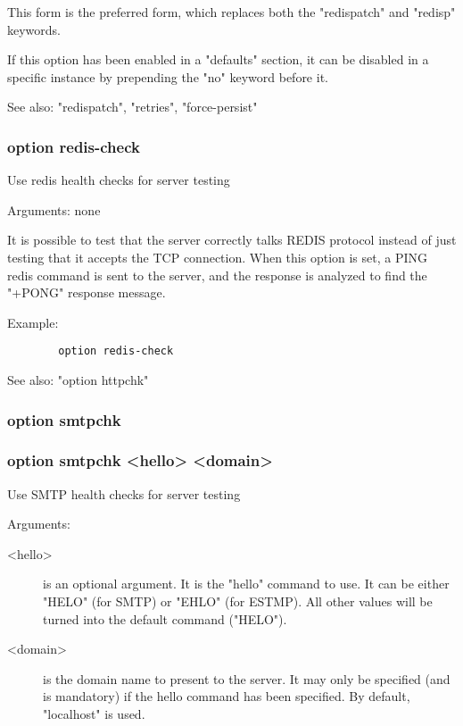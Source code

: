   This form is the preferred form, which replaces both the "redispatch" and
  "redisp" keywords.

  If this option has been enabled in a "defaults" section, it can be disabled
  in a specific instance by prepending the "no" keyword before it.

  See also: "redispatch", "retries", "force-persist"

\subsubsection{option redis-check}


  Use redis health checks for server testing


  Arguments: none

  It is possible to test that the server correctly talks REDIS protocol instead
  of just testing that it accepts the TCP connection. When this option is set,
  a PING redis command is sent to the server, and the response is analyzed to
  find the "+PONG" response message.

  Example:
\begin{verbatim}
        option redis-check
\end{verbatim}

  See also: "option httpchk"

\subsubsection{option smtpchk}
\subsubsection*{option smtpchk <hello> <domain>}


  Use SMTP health checks for server testing


  Arguments:
  
\begin{description}
\item[<hello>]   is an optional argument. It is the "hello" command to use. It can
              be either "HELO" (for SMTP) or "EHLO" (for ESTMP). All other
              values will be turned into the default command ("HELO").

\item[<domain>] is the domain name to present to the server. It may only be
              specified (and is mandatory) if the hello command has been
              specified. By default, "localhost" is used.
\end{description}

